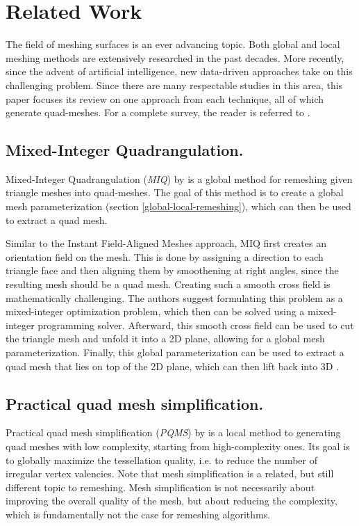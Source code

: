 \documentclass{ACGSeminar}
\begin{document}
\section{Related Work}\label{related_work}
The field of meshing surfaces is an ever advancing topic. Both global and local meshing methods are extensively researched in the past decades. More recently, since the advent of artificial intelligence, new data-driven approaches take on this challenging problem. Since there are many respectable studies in this area, this paper focuses its review on one approach from each technique, all of which generate quad-meshes. For a complete survey, the reader is referred to \cite{bommes2013quad}.

\subsection*{Mixed-Integer Quadrangulation.}\label{MIQ}
Mixed-Integer Quadrangulation (\textit{MIQ}) by \cite{bommes2009mixed} is a global method for remeshing given triangle meshes into quad-meshes. The goal of this method is to create a global mesh parameterization (section \ref{global-local-remeshing}), which can then be used to extract a quad mesh.\bigskip

Similar to the Instant Field-Aligned Meshes approach, MIQ first creates an orientation field on the mesh. This is done by assigning a direction to each triangle face and then aligning them by smoothening at right angles, since the resulting mesh should be a quad mesh. Creating such a smooth cross field is mathematically challenging. The authors suggest formulating this problem as a mixed-integer optimization problem, which then can be solved using a mixed-integer programming solver. Afterward, this smooth cross field can be used to cut the triangle mesh and unfold it into a 2D plane, allowing for a global mesh parameterization. Finally, this global parameterization can be used to extract a quad mesh that lies on top of the 2D plane, which can then lift back into 3D \cite{bommes2009mixed,schmidt2014towards}.

\subsection*{Practical quad mesh simplification.}\label{PQMS}
Practical quad mesh simplification (\textit{PQMS}) by \cite{tarini2010practical} is a local method to generating quad meshes with low complexity, starting from high-complexity ones. Its goal is to globally maximize the tessellation quality, i.e. to reduce the number of irregular vertex valencies. Note that mesh simplification is a related, but still different topic to remeshing. Mesh simplification is not necessarily about improving the overall quality of the mesh, but about reducing the complexity, which is fundamentally not the case for remeshing algorithms.\bigskip
\end{document}
